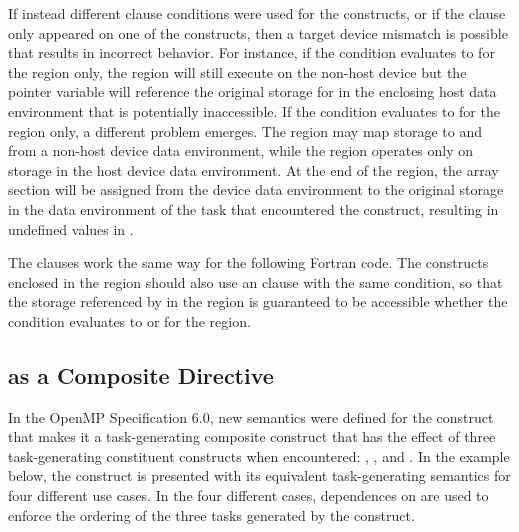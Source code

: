 If instead different  clause conditions were used for the constructs,
or if the clause only appeared on one of the constructs, then a target device
mismatch is possible that results in incorrect behavior. For instance, if the
condition evaluates to  for the  region only,
the  region will still execute on the non-host device but the
pointer variable  will reference the original storage for
 in the enclosing host data environment that is potentially
inaccessible. If the condition evaluates to  for the 
region only, a different problem emerges. The  region may map
storage to and from a non-host device data environment, while the 
region operates only on storage in the host device data environment. At the end
of the  region, the array section  will be
assigned from the device data environment to the original storage in the data
environment of the task that encountered the  construct,
resulting in undefined values in .



The  clauses work the same way for the following Fortran code. The
 constructs enclosed in the  region should also
use an  clause with the same condition, so that the storage referenced
by  in the  region is guaranteed to be accessible whether
the condition evaluates to  or  for the
 region.


\subsection{ as a Composite Directive}
\label{subsec:composite_target_data}

In the OpenMP Specification 6.0, new semantics were defined for the  construct that 
makes it a task-generating composite construct that has the effect of three task-generating 
constituent constructs when encountered: , , and 
.
In the example below, the  construct is presented with its equivalent 
task-generating semantics for four different use cases.
In the four different cases, dependences on  are used to enforce the ordering of 
the three tasks generated by the  construct.

